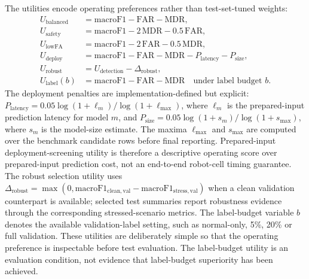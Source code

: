 The utilities encode operating preferences rather than test-set-tuned weights:
\begin{align}
U_{\mathrm{balanced}} &= \mathrm{macroF1}-\mathrm{FAR}-\mathrm{MDR},\label{eq:ubalanced}\\
U_{\mathrm{safety}} &= \mathrm{macroF1}-2\,\mathrm{MDR}-0.5\,\mathrm{FAR},\label{eq:usafety}\\
U_{\mathrm{lowFA}} &= \mathrm{macroF1}-2\,\mathrm{FAR}-0.5\,\mathrm{MDR},\label{eq:ulowfa}\\
U_{\mathrm{deploy}} &= \mathrm{macroF1}-\mathrm{FAR}-\mathrm{MDR}-P_{\mathrm{latency}}-P_{\mathrm{size}},\label{eq:udeploy}\\
U_{\mathrm{robust}} &= U_{\mathrm{detection}}-\Delta_{\mathrm{robust}},\label{eq:urobust}\\
U_{\mathrm{label}}(b) &= \mathrm{macroF1}-\mathrm{FAR}-\mathrm{MDR}\quad\text{under label budget }b.\label{eq:ulabel}
\end{align}
The deployment penalties are implementation-defined but explicit: $P_{\mathrm{latency}}=0.05\log(1+\ell_m)/\log(1+\ell_{\max})$, where $\ell_m$ is the prepared-input prediction latency for model $m$, and $P_{\mathrm{size}}=0.05\log(1+s_m)/\log(1+s_{\max})$, where $s_m$ is the model-size estimate. The maxima $\ell_{\max}$ and $s_{\max}$ are computed over the benchmark candidate rows before final reporting. Prepared-input deployment-screening utility is therefore a descriptive operating score over prepared-input prediction cost, not an end-to-end robot-cell timing guarantee. The robust selection utility uses $\Delta_{\mathrm{robust}}=\max(0,\mathrm{macroF1}_{\mathrm{clean,val}}-\mathrm{macroF1}_{\mathrm{stress,val}})$ when a clean validation counterpart is available; selected test summaries report robustness evidence through the corresponding stressed-scenario metrics. The label-budget variable $b$ denotes the available validation-label setting, such as normal-only, 5\%, 20\% or full validation. These utilities are deliberately simple so that the operating preference is inspectable before test evaluation. The label-budget utility is an evaluation condition, not evidence that label-budget superiority has been achieved.

